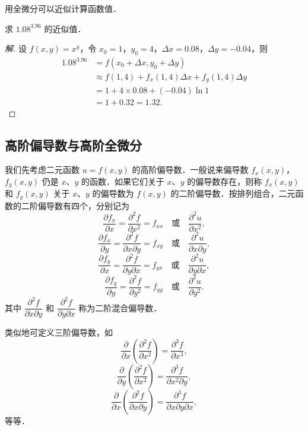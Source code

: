 用全微分可以近似计算函数值．

\begin{example}\label{ex:16-1-6}
求 $1.08^{3.96}$ 的近似值．
\end{example}

\begin{proof}[解]
设 $f(x,y)=x^{y}$，令 $x_{0}=1$，$y_{0}=4$，$\Delta x=0.08$，$\Delta y=-0.04$，则
\[
\begin{aligned}
1.08^{3.96}&=f(x_{0}+\Delta x,y_{0}+\Delta y)\\
&\approx f(1,4)+f_{x}(1,4)\Delta x+f_{y}(1,4)\Delta y\\
&=1+4\times 0.08+(-0.04)\ln 1\\
&=1+0.32=1.32.
\end{aligned}
\]
\end{proof}

\subsection{高阶偏导数与高阶全微分}

我们先考虑二元函数 $u=f(x,y)$ 的高阶偏导数．一般说来偏导数 $f_{x}(x,y)$，$f_{y}(x,y)$ 仍是 $x$、$y$ 的函数．如果它们关于 $x$、$y$ 的偏导数存在，则称 $f_{x}(x,y)$ 和 $f_{y}(x,y)$ 关于 $x$、$y$ 的偏导数为 $f(x,y)$ 的二阶偏导数．按排列组合，二元函数的二阶偏导数有四个，分别记为
\[
\frac{\partial f_{x}}{\partial x}=\frac{\partial^{2}f}{\partial x^{2}}=f_{xx}\quad\text{或}\quad\frac{\partial^{2}u}{\partial x^{2}},
\]
\[
\frac{\partial f_{x}}{\partial y}=\frac{\partial^{2}f}{\partial x\partial y}=f_{xy}\quad\text{或}\quad\frac{\partial^{2}u}{\partial x\partial y},
\]
\[
\frac{\partial f_{y}}{\partial x}=\frac{\partial^{2}f}{\partial y\partial x}=f_{yx}\quad\text{或}\quad\frac{\partial^{2}u}{\partial y\partial x},
\]
\[
\frac{\partial f_{y}}{\partial y}=\frac{\partial^{2}f}{\partial y^{2}}=f_{yy}\quad\text{或}\quad\frac{\partial^{2}u}{\partial y^{2}}.
\]
其中 $\dfrac{\partial^{2}f}{\partial x\partial y}$ 和 $\dfrac{\partial^{2}f}{\partial y\partial x}$ 称为二阶混合偏导数．

类似地可定义三阶偏导数，如
\[
\frac{\partial}{\partial x}\left(\frac{\partial^{2}f}{\partial x^{2}}\right)=\frac{\partial^{3}f}{\partial x^{3}},
\]
\[
\frac{\partial}{\partial y}\left(\frac{\partial^{2}f}{\partial x^{2}}\right)=\frac{\partial^{3}f}{\partial x^{2}\partial y},
\]
\[
\frac{\partial}{\partial x}\left(\frac{\partial^{2}f}{\partial x\partial y}\right)=\frac{\partial^{3}f}{\partial x\partial y\partial x},
\]
等等．

